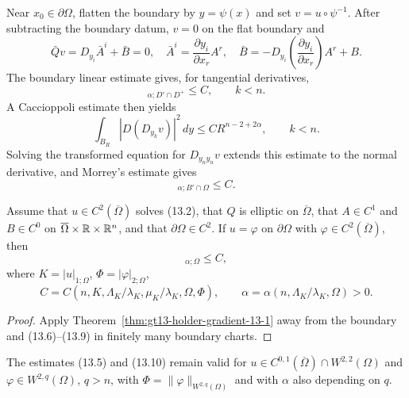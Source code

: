 Near $x_0\in\partial\Omega$, flatten the boundary by $y=\psi(x)$ and set
$v=u\circ\psi^{-1}$.  After subtracting the boundary datum, $v=0$ on the
flat boundary and
\begin{equation}
\bar Qv=D_{y_i}\bar A^i+\bar B=0,
\quad
\bar A^i=\frac{\partial y_i}{\partial x_r}A^r,
\quad
\bar B=-D_{y_i}\!\left(\frac{\partial y_i}{\partial x_r}\right)A^r+B.
\tag{13.6}
\end{equation}
The boundary linear estimate gives, for tangential derivatives,
\begin{equation}
[D_{y_k}v]_{\alpha;D'\cap D^+}\le C,
\qquad k<n.
\tag{13.7}
\end{equation}
A Caccioppoli estimate then yields
\begin{equation}
\int_{B_R}|D(D_{y_k}v)|^2\,dy\le CR^{n-2+2\alpha},
\qquad k<n.
\tag{13.8}
\end{equation}
Solving the transformed equation for $D_{y_ny_n}v$ extends this estimate to
the normal derivative, and Morrey's estimate gives
\begin{equation}
[Du]_{\alpha;B'\cap\Omega}\le C.
\tag{13.9}
\end{equation}

\begin{theorem}
\label{thm:gt13-holder-gradient-13-2}
Assume that $u\in C^2(\overline\Omega)$ solves \textup{(13.2)}, that $Q$ is
elliptic on $\overline\Omega$, that $A\in C^1$ and $B\in C^0$ on
$\overline\Omega\times\mathbb{R}\times\mathbb{R}^n$, and that $\partial\Omega\in C^2$.
If $u=\varphi$ on $\partial\Omega$ with
$\varphi\in C^2(\overline\Omega)$, then
\begin{equation}
[Du]_{\alpha;\Omega}\le C,
\tag{13.10}
\end{equation}
where $K=|u|_{1;\Omega}$, $\Phi=|\varphi|_{2;\Omega}$,
\[
C=C(n,K,\Lambda_K/\lambda_K,\mu_K/\lambda_K,\Omega,\Phi),
\qquad
\alpha=\alpha(n,\Lambda_K/\lambda_K,\Omega)>0.
\]
\end{theorem}
\begin{proof}
\sketch Apply Theorem~\ref{thm:gt13-holder-gradient-13-1} away from the
boundary and \textup{(13.6)--(13.9)} in finitely many boundary charts.
\end{proof}

The estimates \textup{(13.5)} and \textup{(13.10)} remain valid for
$u\in C^{0,1}(\overline\Omega)\cap W^{2,2}(\Omega)$ and
$\varphi\in W^{2,q}(\Omega)$, $q>n$, with
$\Phi=\|\varphi\|_{W^{2,q}(\Omega)}$ and with $\alpha$ also depending on $q$.

